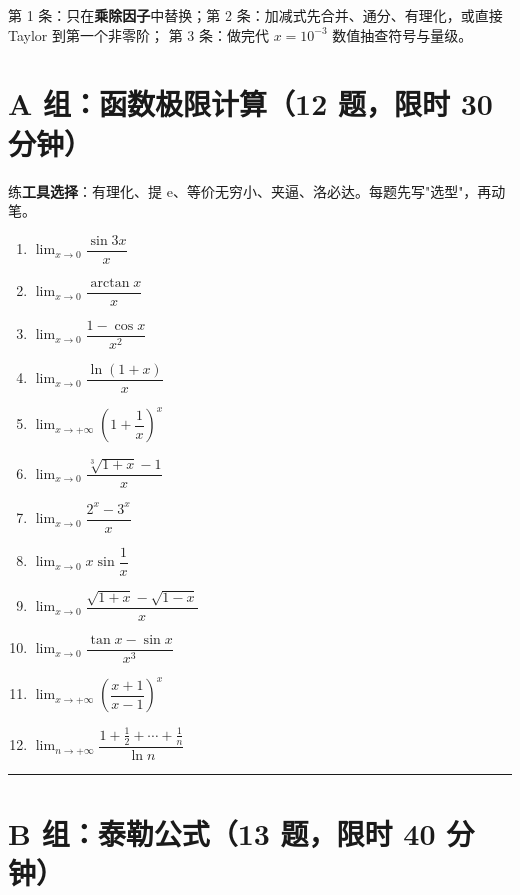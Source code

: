 \documentclass[11pt,a4paper]{ctexart}
\newcommand{\ee}{\mathrm{e}}
\begin{document}
\begin{notebox}
第 1 条：只在\textbf{乘除因子}中替换；第 2 条：加减式先合并、通分、有理化，或直接 Taylor 到第一个非零阶；
第 3 条：做完代 $x=10^{-3}$ 数值抽查符号与量级。
\end{notebox}

\section{A 组：函数极限计算（12 题，限时 30 分钟）}

\begin{notebox}[A 组的目标]
练\textbf{工具选择}：有理化、提 $\ee$、等价无穷小、夹逼、洛必达。每题先写"选型"，再动笔。
\end{notebox}

\begin{enumerate}[label=\textbf{A\arabic*.}]
  \item $\displaystyle \lim_{x\to0}\dfrac{\sin 3x}{x}$
  \item $\displaystyle \lim_{x\to0}\dfrac{\arctan x}{x}$
  \item $\displaystyle \lim_{x\to0}\dfrac{1-\cos x}{x^{2}}$
  \item $\displaystyle \lim_{x\to0}\dfrac{\ln(1+x)}{x}$
  \item $\displaystyle \lim_{x\to+\infty}\left(1+\dfrac1x\right)^{x}$
  \item $\displaystyle \lim_{x\to0}\dfrac{\sqrt[3]{1+x}-1}{x}$
  \item $\displaystyle \lim_{x\to0}\dfrac{2^{x}-3^{x}}{x}$
  \item $\displaystyle \lim_{x\to0}x\sin\dfrac1x$
  \item $\displaystyle \lim_{x\to0}\dfrac{\sqrt{1+x}-\sqrt{1-x}}{x}$
  \item $\displaystyle \lim_{x\to0}\dfrac{\tan x-\sin x}{x^{3}}$
  \item $\displaystyle \lim_{x\to+\infty}\left(\dfrac{x+1}{x-1}\right)^{x}$
  \item $\displaystyle \lim_{n\to+\infty}\dfrac{1+\frac12+\cdots+\frac1n}{\ln n}$
\end{enumerate}

\vspace{2em}
\noindent\rule{\textwidth}{0.4pt}
\newpage

\section{B 组：泰勒公式（13 题，限时 40 分钟）}
\end{document}

